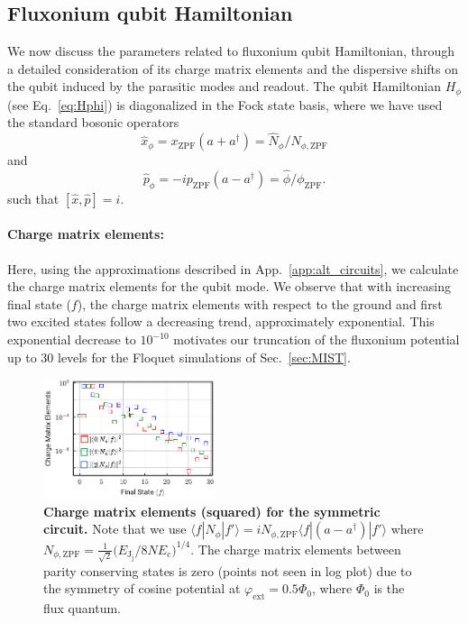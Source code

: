 \documentclass[%
reprint,
superscriptaddress,
 amsmath,amssymb,
 aps,
 prx,
longbibliography,
floatfix,
]{revtex4-2}
\begin{document}
\subsection{Fluxonium qubit Hamiltonian}
We now discuss the parameters related to fluxonium qubit Hamiltonian, through a detailed consideration of its charge matrix elements and the dispersive shifts on the qubit induced by the parasitic modes and readout. The qubit Hamiltonian $H_{\phi}$ (see Eq.~\ref{eq:Hphi}) is diagonalized in the Fock state basis, where we have used the standard bosonic operators
 \begin{equation} \hat x_\phi=x_{\mathrm{ZPF}}(a+a^\dagger)=\hat N_{\phi}/ N_{\phi,\mathrm{ZPF}}
 \end{equation}
 and 
 \begin{equation} \hat p_\phi=-ip_{\mathrm{ZPF}}(a-a^\dagger)=\hat \phi/\phi_{\mathrm{ZPF}}.
 \end{equation}
such that $[\hat x,\hat p]=i$.
\paragraph{Charge matrix elements:}
Here, using the approximations described in App.~\ref{app:alt_circuits}, we calculate the charge matrix elements for the qubit mode. We observe that with increasing final state ($f$), the charge matrix elements with respect to the ground and first two excited states follow a decreasing trend, approximately exponential. This exponential decrease to $10^{-10}$ motivates our truncation of the fluxonium potential up to $30$ levels for the Floquet simulations of Sec.~\ref{sec:MIST}.
\begin{figure}[t]
    \centering
\includegraphics[width=0.45\textwidth]{Supp_Fig/Charge_Matrix.pdf}
    \caption{{\bf Charge matrix 
 elements (squared) for the symmetric circuit.} Note that we use $\langle f|N_\phi|f'\rangle=iN_{\phi,\mathrm{ZPF}}\langle f|(a-a^\dagger)|f'\rangle$ where $N_{\phi,\mathrm{ZPF}}=\frac{1}{\sqrt{2}}\Big(E_{\textrm{J}_\textrm{j}}/8NE_{\textrm{c}}\Big)^{1/4}$. The charge matrix elements between parity conserving states is zero (points not seen in log plot) due to the symmetry of cosine potential at $\varphi_\mathrm{ext}=0.5\Phi_0$, where $\Phi_0$ is the flux quantum.}
    \label{charge-matrix}
\end{figure}
\end{document}
